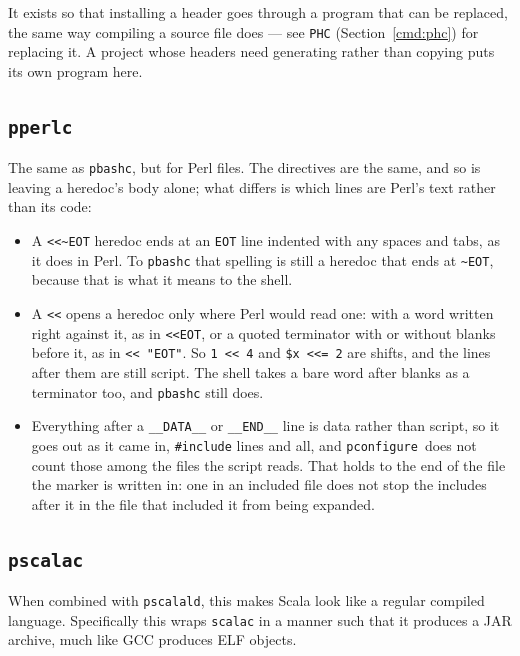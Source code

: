 \documentclass{article}
\newcommand{\pconfigure}{\texttt{pconfigure}}
\begin{document}
It exists so that installing a header goes through a program that can
be replaced, the same way compiling a source file does --- see
\texttt{PHC} (Section~\ref{cmd:phc}) for replacing it.  A project
whose headers need generating rather than copying puts its own
program here.

\subsection{\texttt{pperlc} \label{prog:pperlc}}

The same as \texttt{pbashc}, but for Perl files.  The directives are
the same, and so is leaving a heredoc's body alone; what differs is
which lines are Perl's text rather than its code:
\begin{itemize}
\item A \texttt{<<\textasciitilde EOT} heredoc ends at an
  \texttt{EOT} line indented with any spaces and tabs, as it does in
  Perl.  To \texttt{pbashc} that spelling is still a heredoc that
  ends at \texttt{\textasciitilde EOT}, because that is what it means
  to the shell.
\item A \texttt{<<} opens a heredoc only where Perl would read one:
  with a word written right against it, as in \texttt{<<EOT}, or a
  quoted terminator with or without blanks before it, as in
  \texttt{<< "EOT"}.  So \texttt{1 << 4} and \texttt{\$x <<= 2} are
  shifts, and the lines after them are still script.  The shell takes
  a bare word after blanks as a terminator too, and \texttt{pbashc}
  still does.
\item Everything after a \texttt{\_\_DATA\_\_} or
  \texttt{\_\_END\_\_} line is data rather than script, so it goes
  out as it came in, \texttt{\#include} lines and all, and
  \pconfigure\ does not count those among the files the script reads.
  That holds to the end of the file the marker is written in: one in
  an included file does not stop the includes after it in the file
  that included it from being expanded.
\end{itemize}

\subsection{\texttt{pscalac} \label{prog:pscalac}}

When combined with \texttt{pscalald}, this makes Scala look like a
regular compiled language.  Specifically this wraps \texttt{scalac} in
a manner such that it produces a JAR archive, much like GCC produces
ELF objects.
\end{document}
